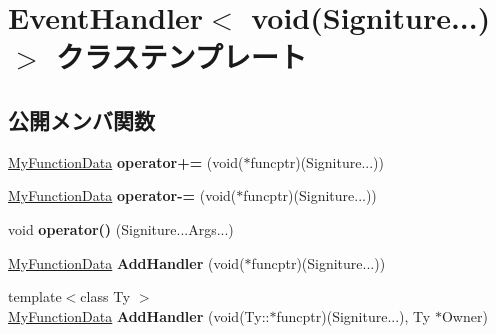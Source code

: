 \hypertarget{class_event_handler_3_01void_07_signiture_8_8_8_08_4}{}\section{Event\+Handler$<$ void(Signiture...)$>$ クラステンプレート}
\label{class_event_handler_3_01void_07_signiture_8_8_8_08_4}
\subsection*{公開メンバ関数}
\begin{DoxyCompactItemize}
\item 
\hyperlink{class_function}{My\+Function\+Data} {\bfseries operator+=} (void($\ast$funcptr)(Signiture...))\hypertarget{class_event_handler_3_01void_07_signiture_8_8_8_08_4_ae0f4909b74dc485c137e0f097a9ceb72}{}\label{class_event_handler_3_01void_07_signiture_8_8_8_08_4_ae0f4909b74dc485c137e0f097a9ceb72}

\item 
\hyperlink{class_function}{My\+Function\+Data} {\bfseries operator-\/=} (void($\ast$funcptr)(Signiture...))\hypertarget{class_event_handler_3_01void_07_signiture_8_8_8_08_4_afcf434ed3ca976cb65c13330e014f607}{}\label{class_event_handler_3_01void_07_signiture_8_8_8_08_4_afcf434ed3ca976cb65c13330e014f607}

\item 
void {\bfseries operator()} (Signiture...\+Args...)\hypertarget{class_event_handler_3_01void_07_signiture_8_8_8_08_4_adf7987b9a412237e5b5c8fd0f07cf210}{}\label{class_event_handler_3_01void_07_signiture_8_8_8_08_4_adf7987b9a412237e5b5c8fd0f07cf210}

\item 
\hyperlink{class_function}{My\+Function\+Data} {\bfseries Add\+Handler} (void($\ast$funcptr)(Signiture...))\hypertarget{class_event_handler_3_01void_07_signiture_8_8_8_08_4_a21b38d9f2108036ca98e52a6f8fd08dc}{}\label{class_event_handler_3_01void_07_signiture_8_8_8_08_4_a21b38d9f2108036ca98e52a6f8fd08dc}

\item 
{\footnotesize template$<$class Ty $>$ }\\\hyperlink{class_function}{My\+Function\+Data} {\bfseries Add\+Handler} (void(Ty\+::$\ast$funcptr)(Signiture...), Ty $\ast$Owner)\hypertarget{class_event_handler_3_01void_07_signiture_8_8_8_08_4_a27da6f7cc9ef97e89510f847cae78202}{}\label{class_event_handler_3_01void_07_signiture_8_8_8_08_4_a27da6f7cc9ef97e89510f847cae78202}


\end{DoxyCompactItemize}
